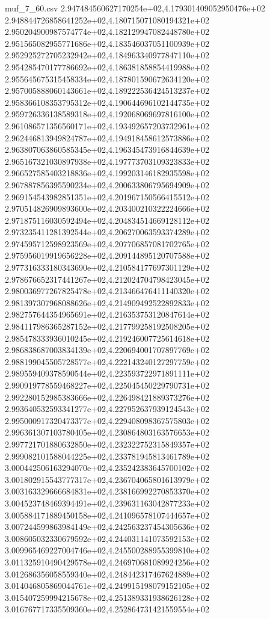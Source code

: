 \begin{filecontents*}{muf_7_60.csv}
2.947484560627170254e+02,4.179301409052950476e+02
2.948844726858641252e+02,4.180715071080194321e+02
2.950204900987574774e+02,4.182129947082448780e+02
2.951565082955771686e+02,4.183546037051100939e+02
2.952925272705232942e+02,4.184963340977847110e+02
2.954285470177786692e+02,4.186381858854419988e+02
2.955645675315458334e+02,4.187801590672634120e+02
2.957005888060143661e+02,4.189222536424513237e+02
2.958366108353795312e+02,4.190644696102144735e+02
2.959726336138589318e+02,4.192068069697816100e+02
2.961086571356560171e+02,4.193492657203732961e+02
2.962446813949824787e+02,4.194918458612573886e+02
2.963807063860585345e+02,4.196345473916844639e+02
2.965167321030897938e+02,4.197773703109323833e+02
2.966527585403218836e+02,4.199203146182935598e+02
2.967887856395590234e+02,4.200633806795694909e+02
2.969154543982851351e+02,4.201967150566415512e+02
2.970514826909893600e+02,4.203400210322224666e+02
2.971875116030592494e+02,4.204834514669128112e+02
2.973235411281392544e+02,4.206270063593374289e+02
2.974595712598923569e+02,4.207706857081702765e+02
2.975956019919656228e+02,4.209144895120707588e+02
2.977316333180343690e+02,4.210584177697301129e+02
2.978676652317441267e+02,4.212024704798423045e+02
2.980036977267825478e+02,4.213466476411140320e+02
2.981397307968088626e+02,4.214909492522892833e+02
2.982757644354965691e+02,4.216353753120847614e+02
2.984117986365287152e+02,4.217799258192508205e+02
2.985478333936010245e+02,4.219246007725614618e+02
2.986838687003834139e+02,4.220694001707897769e+02
2.988199045505728577e+02,4.222143240127297759e+02
2.989559409378590544e+02,4.223593722971891111e+02
2.990919778559468227e+02,4.225045450229790731e+02
2.992280152985383666e+02,4.226498421889373276e+02
2.993640532593341277e+02,4.227952637939124543e+02
2.995000917320473377e+02,4.229408098367575803e+02
2.996361307103780405e+02,4.230864803163576653e+02
2.997721701880632850e+02,4.232322752315849357e+02
2.999082101588044225e+02,4.233781945813461789e+02
3.000442506163294070e+02,4.235242383645700102e+02
3.001802915543777317e+02,4.236704065801613979e+02
3.003163329666684831e+02,4.238166992270853370e+02
3.004523748469394491e+02,4.239631163042877233e+02
3.005884171889450158e+02,4.241096578107444657e+02
3.007244599863984149e+02,4.242563237454305636e+02
3.008605032330679592e+02,4.244031141073592153e+02
3.009965469227004746e+02,4.245500288955399810e+02
3.011325910490429578e+02,4.246970681089924256e+02
3.012686356058559340e+02,4.248442317467624889e+02
3.014046805869044761e+02,4.249915198079152105e+02
3.015407259994215678e+02,4.251389331938626128e+02
3.016767717335509360e+02,4.252864731421559554e+02

\end{filecontents*}
